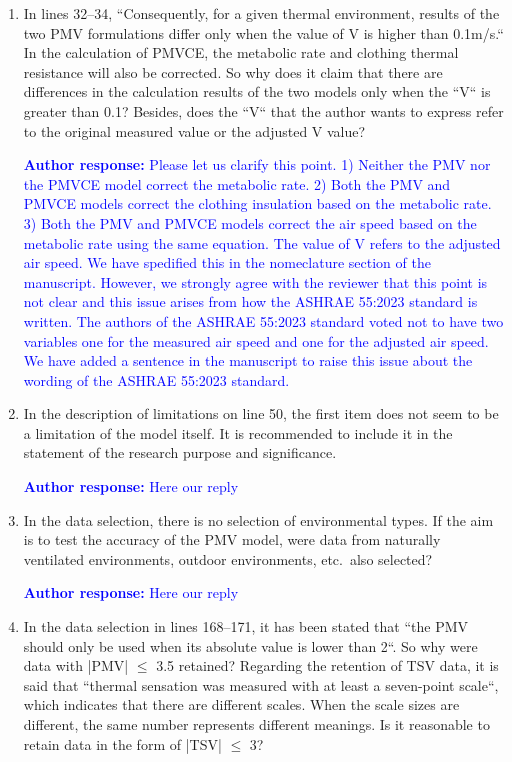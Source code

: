 \documentclass[a4paper, 10pt]{letter}
\newcommand{\response}[1]{\textcolor{blue}{\textbf{Author response:} #1}}
\begin{document}
\begin{letter}
\begin{enumerate}
            \item In lines 32--34, ``Consequently, for a given thermal environment, results of the two PMV formulations differ only when the value of V is higher than 0.1m/s.``
            In the calculation of PMVCE, the metabolic rate and clothing thermal resistance will also be corrected.
            So why does it claim that there are differences in the calculation results of the two models only when the ``V`` is greater than 0.1?
            Besides, does the ``V`` that the author wants to express refer to the original measured value or the adjusted V value?

            \response{
            Please let us clarify this point.
            1) Neither the PMV nor the PMVCE model correct the metabolic rate.
            2) Both the PMV and PMVCE models correct the clothing insulation based on the metabolic rate.
            3) Both the PMV and PMVCE models correct the air speed based on the metabolic rate using the same equation.
                The value of V refers to the adjusted air speed.
                We have spedified this in the nomeclature section of the manuscript.
                However, we strongly agree with the reviewer that this point is not clear and this issue arises from how the ASHRAE 55:2023 standard is written.
                The authors of the ASHRAE 55:2023 standard voted not to have two variables one for the measured air speed and one for the adjusted air speed.
                We have added a sentence in the manuscript to raise this issue about the wording of the ASHRAE 55:2023 standard.
            }

            \item In the description of limitations on line 50, the first item does not seem to be a limitation of the model itself.
            It is recommended to include it in the statement of the research purpose and significance.

            \response{Here our reply}

            \item In the data selection, there is no selection of environmental types.
            If the aim is to test the accuracy of the PMV model, were data from naturally ventilated environments, outdoor environments, etc.\ also selected?

            \response{Here our reply}

            \item In the data selection in lines 168--171, it has been stated that ``the PMV should only be used when its absolute value is lower than 2``.
            So why were data with |PMV| $\leq$ 3.5 retained?
            Regarding the retention of TSV data, it is said that ``thermal sensation was measured with at least a seven-point scale``, which indicates that there are different scales.
            When the scale sizes are different, the same number represents different meanings.
            Is it reasonable to retain data in the form of |TSV| $\leq$ 3?


\end{enumerate}
\end{letter}
\end{document}
